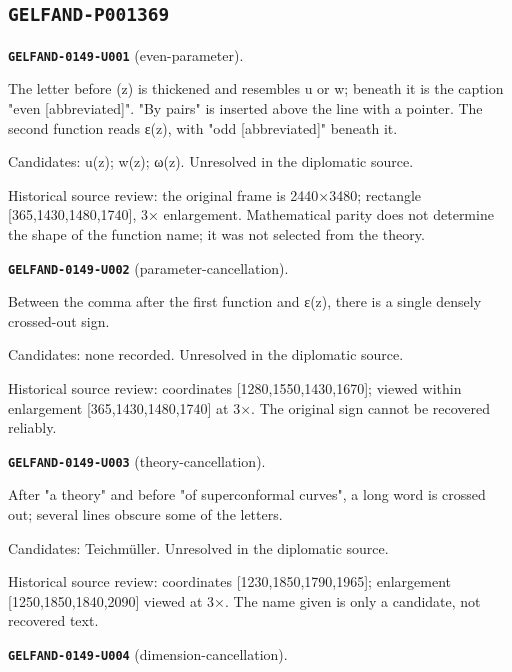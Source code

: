 \documentclass[11pt]{article}
\theoremstyle{definition}
\theoremstyle{remark}
\begin{document}
\subsection*{\texttt{GELFAND-P001369}}
\noindent\leavevmode{}\label{GELFAND-P001369:even-parameter:note}\textbf{\texttt{GELFAND-0149-U001}} (even-parameter).\par\nopagebreak[4]
The letter before (z) is thickened and resembles u or w; beneath it is the caption "even [abbreviated]". "By pairs" is inserted above the line with a pointer. The second function reads ε(z), with "odd [abbreviated]" beneath it.\par
Candidates: u(z); w(z); ω(z). Unresolved in the diplomatic source.\par
Historical source review: the original frame is 2440×3480; rectangle [365,1430,1480,1740], 3× enlargement. Mathematical parity does not determine the shape of the function name; it was not selected from the theory.\par\medskip
\noindent\leavevmode{}\label{GELFAND-P001369:parameter-cancellation:note}\textbf{\texttt{GELFAND-0149-U002}} (parameter-cancellation).\par\nopagebreak[4]
Between the comma after the first function and ε(z), there is a single densely crossed-out sign.\par
Candidates: none recorded. Unresolved in the diplomatic source.\par
Historical source review: coordinates [1280,1550,1430,1670]; viewed within enlargement [365,1430,1480,1740] at 3×. The original sign cannot be recovered reliably.\par\medskip
\noindent\leavevmode{}\label{GELFAND-P001369:theory-cancellation:note}\textbf{\texttt{GELFAND-0149-U003}} (theory-cancellation).\par\nopagebreak[4]
After "a theory" and before "of superconformal curves", a long word is crossed out; several lines obscure some of the letters.\par
Candidates: Teichmüller. Unresolved in the diplomatic source.\par
Historical source review: coordinates [1230,1850,1790,1965]; enlargement [1250,1850,1840,2090] viewed at 3×. The name given is only a candidate, not recovered text.\par\medskip
\noindent\leavevmode{}\label{GELFAND-P001369:dimension-cancellation:note}\textbf{\texttt{GELFAND-0149-U004}} (dimension-cancellation).\par\nopagebreak[4]
\end{document}
